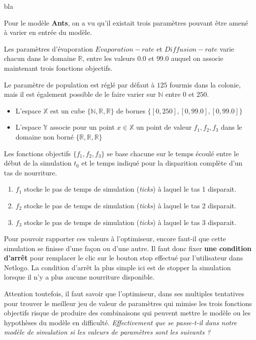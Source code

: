 \begin{framewithtitle}[bla]{bla}

Pour le modèle \textbf{Ants}, on a vu qu'il existait trois paramètres pouvant être amené à varier en entrée du modèle. 


Les paramètres d'évaporation $Evaporation-rate$ et $Diffusion-rate$ varie chacun dans le domaine $\mathbb{R}$, entre les valeurs $0.0$ et $99.0$ auquel on associe maintenant trois fonctions objectifs.

Le paramètre de population est réglé par défaut à $125$ fourmis dans la colonie, mais il est également possible de le faire varier sur $\mathbb{N}$ entre $0$ et $250$. 

\begin{itemize}[noitemsep,nolistsep]
\item L'espace $\mathbb{X}$ est un cube $\{\mathbb{N},\mathbb{R},\mathbb{R}\}$ de bornes $\{[0,250], [0,99.0], [0,99.0]\}$
\item L'espace $\mathbb{Y}$ associe pour un point $x \in \mathbb{X}$ un point de valeur ${f_1,f_2,f_3}$ dans le domaine non borné $\{\mathbb{R},\mathbb{R},\mathbb{R}\}$
\end{itemize}

Les fonctions objectifs $\{f_1,f_2,f_3\}$  se base chacune sur le temps écoulé entre le début de la simulation $t_0$ et le temps indiqué pour la disparition complète d'un tas de nourriture.

\begin{enumerate}
\item $f_1$ stocke le pas de temps de simulation (\textit{ticks}) à laquel le tas 1 disparait.
\item $f_2$ stocke le pas de temps de simulation (\textit{ticks}) à laquel le tas 2 disparait.
\item $f_3$ stocke le pas de temps de simulation (\textit{ticks}) à laquel le tas 3 disparait.
\end{enumerate}

Pour pouvoir rapporter ces valeurs à l'optimiseur, encore faut-il que cette simulation se finisse d'une façon ou d'une autre. Il faut donc fixer \textbf{une condition d'arrêt} pour remplacer le clic sur le bouton stop effectué par l'utilisateur dans Netlogo. La condition d'arrêt la plus simple ici est de stopper la simulation lorsque il n'y a plus aucune nourriture disponible.

Attention toutefois, il faut savoir que l'optimiseur, dans ses multiples tentatives pour trouver le meilleur jeu de valeur de paramètres qui mimise les trois fonctions objectifs risque de produire des combinaisons qui peuvent mettre le modèle ou les hypothèses du modèle en difficulté. \textit{Effectivement que se passe-t-il dans notre modèle de simulation si les valeurs de paramètres sont les suivants ? }


\end{framewithtitle}
